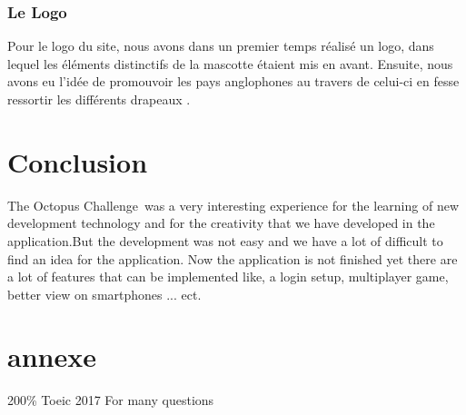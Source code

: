 \documentclass[a4paper,11pt, oneside]{book}
\def\appName{The Octopus Challenge}
\begin{document}
\subsection*{Le Logo}
Pour le logo du site, nous avons dans un premier temps réalisé un logo, dans lequel les éléments distinctifs de la mascotte étaient mis en avant.
Ensuite, nous avons eu l’idée de promouvoir les pays anglophones au travers de celui-ci en fesse ressortir les différents drapeaux .


\chapter{Conclusion}
\appName \ was a very interesting experience for the learning of new development technology and for the creativity that we have developed in the application.But the development was not easy and we have a lot of difficult to find an idea for the application.
Now the application is not finished yet there are a lot of features that can be implemented like, a login setup, multiplayer game, better view on smartphones ... ect.

\chapter{annexe}
200\% Toeic 2017 For many questions
\end{document}
